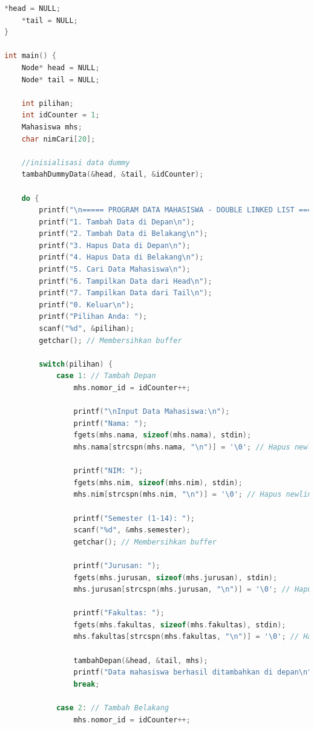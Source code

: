 \documentclass{article}
\begin{document}
\begin{lstlisting}[language=C, caption={Program Double Linked List},
  label={lst:sample-c-code}, basicstyle=\ttfamily\footnotesize,
  keywordstyle=\color{blue}, commentstyle=\color{green},
  stringstyle=\color{red}]
    *head = NULL;
    *tail = NULL;
}

int main() {
    Node* head = NULL;
    Node* tail = NULL;
    
    int pilihan;
    int idCounter = 1;
    Mahasiswa mhs;
    char nimCari[20];

    //inisialisasi data dummy
    tambahDummyData(&head, &tail, &idCounter);
    
    do {
        printf("\n===== PROGRAM DATA MAHASISWA - DOUBLE LINKED LIST =====\n");
        printf("1. Tambah Data di Depan\n");
        printf("2. Tambah Data di Belakang\n");
        printf("3. Hapus Data di Depan\n");
        printf("4. Hapus Data di Belakang\n");
        printf("5. Cari Data Mahasiswa\n");
        printf("6. Tampilkan Data dari Head\n");
        printf("7. Tampilkan Data dari Tail\n");
        printf("0. Keluar\n");
        printf("Pilihan Anda: ");
        scanf("%d", &pilihan);
        getchar(); // Membersihkan buffer
        
        switch(pilihan) {
            case 1: // Tambah Depan
                mhs.nomor_id = idCounter++;
                
                printf("\nInput Data Mahasiswa:\n");
                printf("Nama: ");
                fgets(mhs.nama, sizeof(mhs.nama), stdin);
                mhs.nama[strcspn(mhs.nama, "\n")] = '\0'; // Hapus newline
                
                printf("NIM: ");
                fgets(mhs.nim, sizeof(mhs.nim), stdin);
                mhs.nim[strcspn(mhs.nim, "\n")] = '\0'; // Hapus newline
                
                printf("Semester (1-14): ");
                scanf("%d", &mhs.semester);
                getchar(); // Membersihkan buffer
                
                printf("Jurusan: ");
                fgets(mhs.jurusan, sizeof(mhs.jurusan), stdin);
                mhs.jurusan[strcspn(mhs.jurusan, "\n")] = '\0'; // Hapus newline
                
                printf("Fakultas: ");
                fgets(mhs.fakultas, sizeof(mhs.fakultas), stdin);
                mhs.fakultas[strcspn(mhs.fakultas, "\n")] = '\0'; // Hapus newline
                
                tambahDepan(&head, &tail, mhs);
                printf("Data mahasiswa berhasil ditambahkan di depan\n");
                break;
                
            case 2: // Tambah Belakang
                mhs.nomor_id = idCounter++;
                

\end{lstlisting}
\end{document}
